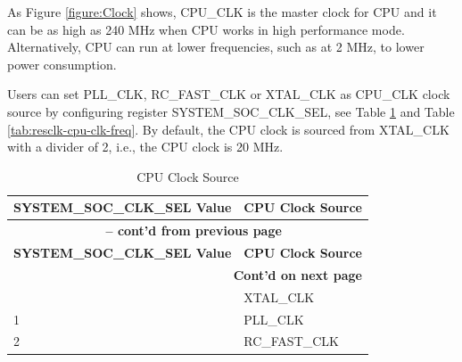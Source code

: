 \documentclass[main\_\_EN.tex]{subfiles}
\begin{document}
As Figure \ref{figure:Clock} shows, CPU\_CLK is the master clock for CPU and it can be as high as 240 MHz when CPU works in high performance mode. Alternatively, CPU can run at lower frequencies, such as at 2 MHz, to lower power consumption.

Users can set PLL\_CLK, RC\_FAST\_CLK or XTAL\_CLK as CPU\_CLK clock source by configuring register SYSTEM\_SOC\_CLK\_SEL, see Table \ref{tab:resclk-cpu-clk-src} and Table \ref{tab:resclk-cpu-clk-freq}. By default, the CPU clock is sourced from XTAL\_CLK with a divider of 2, i.e., the CPU clock is 20 MHz.

\begin{longtable}[c]{|p{5cm}|p{4cm}| }
       \caption{CPU Clock Source}
		\label{tab:resclk-cpu-clk-src} \\
	    \hline
        \rowcolor{lightgray}
         \textbf{SYSTEM\_SOC\_CLK\_SEL Value} &  \textbf{CPU Clock Source} \\\hline
         \endfirsthead

       \multicolumn{2}{c}{\bfseries \tablename\ \thetable{} -- cont'd from previous page}\\\hline
       \rowcolor{lightgray}
         \textbf{SYSTEM\_SOC\_CLK\_SEL Value} &  \textbf{CPU Clock Source} \\\hline
         \endhead

    \multicolumn{2}{r}{\textbf{Cont'd on next page}} \\
    \endfoot
    \endlastfoot
    \hline
        0 & XTAL\_CLK \\
        \hline
        1 & PLL\_CLK \\
        \hline
        2 & RC\_FAST\_CLK \\
        \hline
\end{longtable}
\end{document}

